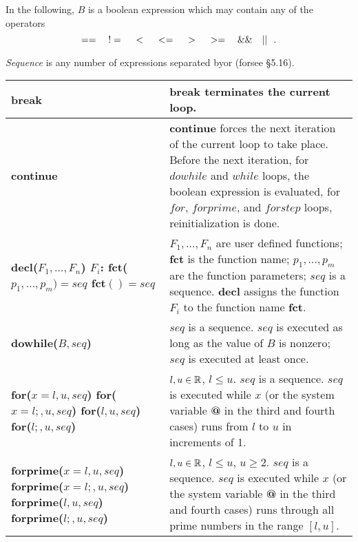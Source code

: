 In the following, $B$ is a boolean expression which may contain
any of the operators
$$ == \mbox{\ \ }\ != \mbox{\ \ }\ < \mbox{\ \ }\ <= \mbox{\ \ }\ > \mbox{\ \ }\ >= \mbox{\ \ }\ \&\& \mbox{\ \ }\ ||\mbox{\ \ } .$$

{\sl Sequence\/} is any number of expressions separated by\Spp {\bf \_}\Spp or
\Spp{\bf ;}\Spp (for\Spp {\bf ;}\Spp see \S 5.16).

\leer\leer
\begin{tabular}{|p{1.95in}|p{3.7in}|} \hline

{\bf break} &
{\bf break} terminates the current loop.\\ \hline

{\bf continue} &
{\bf continue} forces the next iteration of the current loop to
take place. Before the next iteration, for $dowhile$ and $while$ loops,
the boolean expression is evaluated, for $for$, $forprime$, and $forstep$
loops, reinitialization is done.\\ \hline

{\bf decl($F_1,\ldots,F_n$)\newline
$F_i$: fct($p_1,\ldots,p_m)=seq$\newline
\hspace*{0.7cm}fct$()=seq$} &
{\bf $F_1,\ldots,F_n$} are user defined functions; {\bf fct} is the
function name; {\bf $p_1,\ldots,p_m$} are the function parameters; {\bf $seq$}
is a sequence.\newline
{\bf decl} assigns the function {\bf $F_i$} to the function name {\bf fct}.\\ \hline

{\bf dowhile($B, seq$)} &
$seq$ is a sequence.\newline
$seq$ is executed as long as the value of $B$ is nonzero; $seq$ is
executed at least once.\\ \hline

{\bf for($x = l, u, seq$)\newline
for($x = l;, u, seq$)\newline
for($l, u, seq$)\newline
for($l;, u, seq$)} &
$l, u \in \mbox{$\mathbb R$}$, $l \leq u$.\newline
$seq$ is a sequence.\newline
$seq$ is executed  while $x$ (or the system variable {\bf @} in
the third and fourth cases) runs from $l$ to $u$ in increments of 1.\\ \hline

{\bf forprime($x = l, u, seq$)\newline
forprime($x = l;, u, seq$)\newline
forprime($l, u, seq$)\newline
forprime($l;, u, seq$)} &
$l, u \in \mbox{$\mathbb R$}$, $l \leq u$, $u \geq 2$.\newline
$seq$ is a sequence.\newline
$seq$ is executed  while $x$ (or the system variable {\bf @} in
the third and fourth cases) runs through all prime numbers in the
range $[l, u]$.\\ \hline


\end{tabular}
